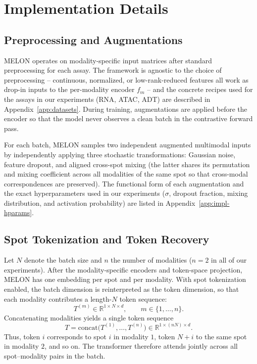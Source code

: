 \documentclass{article}
\theoremstyle{plain}
\theoremstyle{definition}
\begin{document}
\section{Implementation Details}\label{app:impl}

\subsection{Preprocessing and Augmentations}\label{app:impl-aug}

MELON operates on modality-specific input matrices after standard preprocessing for each assay. The framework is agnostic to the choice of preprocessing -- continuous, normalized, or low-rank-reduced features all work as drop-in inputs to the per-modality encoder $f_m$ -- and the concrete recipes used for the assays in our experiments (RNA, ATAC, ADT) are described in Appendix~\ref{app:datasets}. During training, augmentations are applied before the encoder so that the model never observes a clean batch in the contrastive forward pass.

For each batch, MELON samples two independent augmented multimodal inputs by independently applying three stochastic transformations: Gaussian noise, feature dropout, and aligned cross-spot mixing (the latter shares its permutation and mixing coefficient across all modalities of the same spot so that cross-modal correspondences are preserved). The functional form of each augmentation and the exact hyperparameters used in our experiments ($\sigma$, dropout fraction, mixing distribution, and activation probability) are listed in Appendix~\ref{app:impl-hparams}.

\subsection{Spot Tokenization and Token Recovery}\label{app:impl-token}

Let $N$ denote the batch size and $n$ the number of modalities ($n = 2$ in all of our experiments). After the modality-specific encoders and token-space projection, MELON has one embedding per spot and per modality. With spot tokenization enabled, the batch dimension is reinterpreted as the token dimension, so that each modality contributes a length-$N$ token sequence:
\begin{equation}
  T^{(m)} \in \mathbb{R}^{1 \times N \times d}, \qquad m \in \{1, \ldots, n\}.
\end{equation}
Concatenating modalities yields a single token sequence
\begin{equation}
  T = \mathrm{concat}\bigl(T^{(1)}, \ldots, T^{(n)}\bigr) \in \mathbb{R}^{1 \times (nN) \times d}.
\end{equation}
Thus, token $i$ corresponds to spot $i$ in modality $1$, token $N+i$ to the same spot in modality $2$, and so on. The transformer therefore attends jointly across all spot--modality pairs in the batch.
\end{document}
